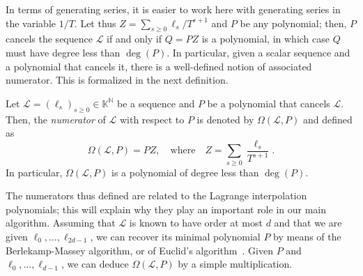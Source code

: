 \documentclass[final,1p,times,authoryear]{elsarticle}
\newcommand{\genseries}{Z}
\newcommand{\minpoly}{P}
\def\M {\ensuremath{\mathsf{M}}}
\def\N {\ensuremath{\mathbb{N}}}
\def\K{\mathbb{K}}
\def\K {\ensuremath{\mathbb{K}}}
\begin{document}
In terms of generating series, it is easier to work here with
generating series in the variable $1/T$.  Let thus $\genseries =
\sum_{s\ge0} \ell_s / T^{s+1}$ and $\minpoly$ be any polynomial; then,
$\minpoly$ cancels the sequence $\mathcal{L}$ if and only if
$Q=\minpoly \genseries $ is a polynomial, in which case $Q$ must have
degree less than $\deg(\minpoly)$.  In particular, given a scalar
sequence and a polynomial that cancels it, there is a well-defined
notion of associated numerator. This is formalized in the next
definition.

\begin{definition}
  \label{def:omega}
  Let $\mathcal{L}=(\ell_s)_{s \ge 0}\in \K^\N$ be a sequence and $P$ be a
  polynomial that cancels $\mathcal{L}$. Then, the {\em numerator} of $\mathcal{L}$
  with respect to $P$ is denoted by $\Omega(\mathcal{L},P)$ and defined as 
  \[
    \Omega(\mathcal{L},P) = P \genseries, \quad\text{where}\quad
    \genseries=\sum_{s \ge 0} \frac {\ell_s}{T^{s+1}}.
  \]
  In particular, $\Omega(\mathcal{L},P)$ is a polynomial of
  degree less than $\deg(P)$.
\end{definition}


The numerators thus defined are related to the Lagrange interpolation
polynomials; this will explain why they play an important role in our
main algorithm. Assuming that $\mathcal{L}$ is known to have order at
most $d$ and that we are given $\ell_0,\dots,\ell_{2d-1}$, we can recover
its minimal polynomial $P$ by means of the Berlekamp-Massey algorithm,
or of Euclid's algorithm~\citep{BrGuYu80}. Given $P$ and
$\ell_0,\dots,\ell_{d-1}$, we can deduce
$\Omega(\mathcal{L},P)$ by a simple multiplication.

\end{document}

